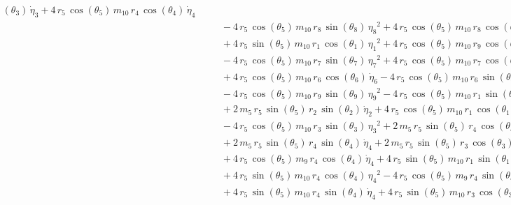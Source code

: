 \begin{eqnarray*}
({\theta_{3}})\,{\dot{\eta}_{3}} + 4\,r_{5}\,\cos({\theta_{5}})\,m_{10
}\,r_{4}\,\cos({\theta_{4}})\,{\dot{\eta}_{4}} \\ &&\quad\mbox{} - 4\,
r_{5}\,\cos({\theta_{5}})\,m_{10}\,r_{8}\,\sin({\theta_{8}})\,{{\eta_{
8}}}^2 + 4\,r_{5}\,\cos({\theta_{5}})\,m_{10}\,r_{8}\,\cos({\theta_{8}
})\,{\dot{\eta}_{8}} \\ &&\quad\mbox{} + 4\,r_{5}\,\sin({\theta_{5}})
\,m_{10}\,r_{1}\,\cos({\theta_{1}})\,{{\eta_{1}}}^2 + 4\,r_{5}\,\cos({
\theta_{5}})\,m_{10}\,r_{9}\,\cos({\theta_{9}})\,{\dot{\eta}_{9}}
 \\ &&\quad\mbox{} - 4\,r_{5}\,\cos({\theta_{5}})\,m_{10}\,r_{7}\,\sin
({\theta_{7}})\,{{\eta_{7}}}^2 + 4\,r_{5}\,\cos({\theta_{5}})\,m_{10}
\,r_{7}\,\cos({\theta_{7}})\,{\dot{\eta}_{7}} \\ &&\quad\mbox{} + 4\,r
_{5}\,\cos({\theta_{5}})\,m_{10}\,r_{6}\,\cos({\theta_{6}})\,{
\dot{\eta}_{6}} - 4\,r_{5}\,\cos({\theta_{5}})\,m_{10}\,r_{6}\,\sin({
\theta_{6}})\,{{\eta_{6}}}^2 \\ &&\quad\mbox{} - 4\,r_{5}\,\cos({
\theta_{5}})\,m_{10}\,r_{9}\,\sin({\theta_{9}})\,{{\eta_{9}}}^2 - 4\,r
_{5}\,\cos({\theta_{5}})\,m_{10}\,r_{1}\,\sin({\theta_{1}})\,{{\eta_{1
}}}^2 \\ &&\quad\mbox{} + 2\,m_{5}\,r_{5}\,\sin({\theta_{5}})\,r_{2}\,
\sin({\theta_{2}})\,{\dot{\eta}_{2}} + 4\,r_{5}\,\cos({\theta_{5}})\,m
_{10}\,r_{1}\,\cos({\theta_{1}})\,{\dot{\eta}_{1}} \\ &&\quad\mbox{}
 - 4\,r_{5}\,\cos({\theta_{5}})\,m_{10}\,r_{3}\,\sin({\theta_{3}})\,{{
\eta_{3}}}^2 + 2\,m_{5}\,r_{5}\,\sin({\theta_{5}})\,r_{4}\,\cos({
\theta_{4}})\,{{\eta_{4}}}^2 \\ &&\quad\mbox{} + 2\,m_{5}\,r_{5}\,\sin
({\theta_{5}})\,r_{4}\,\sin({\theta_{4}})\,{\dot{\eta}_{4}} + 2\,m_{5}
\,r_{5}\,\sin({\theta_{5}})\,r_{3}\,\cos({\theta_{3}})\,{{\eta_{3}}}^2
 \\ &&\quad\mbox{} + 4\,r_{5}\,\cos({\theta_{5}})\,m_{9}\,r_{4}\,\cos(
{\theta_{4}})\,{\dot{\eta}_{4}} + 4\,r_{5}\,\sin({\theta_{5}})\,m_{10}
\,r_{1}\,\sin({\theta_{1}})\,{\dot{\eta}_{1}} \\ &&\quad\mbox{} + 4\,r
_{5}\,\sin({\theta_{5}})\,m_{10}\,r_{4}\,\cos({\theta_{4}})\,{{\eta_{4
}}}^2 - 4\,r_{5}\,\cos({\theta_{5}})\,m_{9}\,r_{4}\,\sin({\theta_{4}})
\,{{\eta_{4}}}^2 \\ &&\quad\mbox{} + 4\,r_{5}\,\sin({\theta_{5}})\,m_{
10}\,r_{4}\,\sin({\theta_{4}})\,{\dot{\eta}_{4}} + 4\,r_{5}\,\sin({
\theta_{5}})\,m_{10}\,r_{3}\,\cos({\theta_{3}})\,{{\eta_{3}}}^2

\end{eqnarray*}
